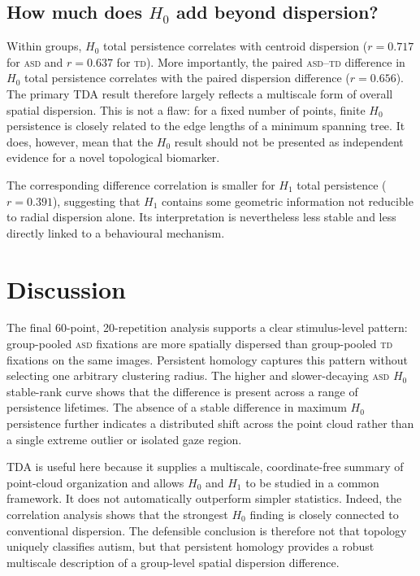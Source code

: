 \documentclass[11pt,a4paper]{article}
\newcommand{\ASD}{\textsc{asd}}
\newcommand{\TD}{\textsc{td}}
\begin{document}
\subsection{How much does $H_0$ add beyond dispersion?}

Within groups, $H_0$ total persistence correlates with centroid dispersion
($r=0.717$ for \ASD{} and $r=0.637$ for \TD{}).  More importantly, the paired
\ASD--\TD{} difference in $H_0$ total persistence correlates with the paired
dispersion difference ($r=0.656$).  The primary TDA result therefore largely
reflects a multiscale form of overall spatial dispersion.  This is not a flaw:
for a fixed number of points, finite $H_0$ persistence is closely related to
the edge lengths of a minimum spanning tree.  It does, however, mean that the
$H_0$ result should not be presented as independent evidence for a novel
topological biomarker.

The corresponding difference correlation is smaller for $H_1$ total
persistence ($r=0.391$), suggesting that $H_1$ contains some geometric
information not reducible to radial dispersion alone.  Its interpretation is
nevertheless less stable and less directly linked to a behavioural mechanism.

\section{Discussion}

The final 60-point, 20-repetition analysis supports a clear stimulus-level
pattern: group-pooled \ASD{} fixations are more spatially dispersed than
group-pooled \TD{} fixations on the same images.  Persistent homology captures
this pattern without selecting one arbitrary clustering radius.  The higher
and slower-decaying \ASD{} $H_0$ stable-rank curve shows that the difference is
present across a range of persistence lifetimes.  The absence of a stable
difference in maximum $H_0$ persistence further indicates a distributed shift
across the point cloud rather than a single extreme outlier or isolated gaze
region.

TDA is useful here because it supplies a multiscale, coordinate-free summary
of point-cloud organization and allows $H_0$ and $H_1$ to be studied in a
common framework.  It does not automatically outperform simpler statistics.
Indeed, the correlation analysis shows that the strongest $H_0$ finding is
closely connected to conventional dispersion.  The defensible conclusion is
therefore not that topology uniquely classifies autism, but that persistent
homology provides a robust multiscale description of a group-level spatial
dispersion difference.
\end{document}
